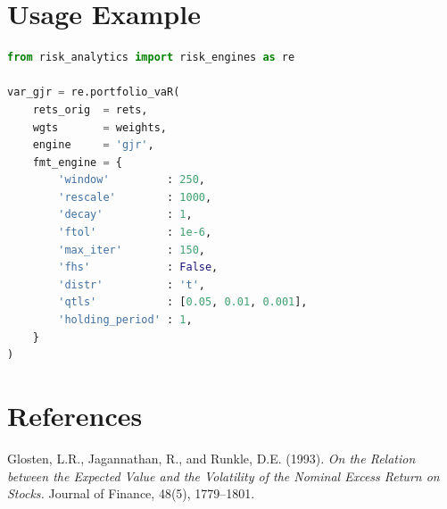 \documentclass[11pt, a4paper]{article}
\begin{document}
\section{Usage Example}

\begin{lstlisting}[language=Python]
from risk_analytics import risk_engines as re

var_gjr = re.portfolio_vaR(
    rets_orig  = rets,
    wgts       = weights,
    engine     = 'gjr',
    fmt_engine = {
        'window'         : 250,
        'rescale'        : 1000,
        'decay'          : 1,
        'ftol'           : 1e-6,
        'max_iter'       : 150,
        'fhs'            : False,
        'distr'          : 't',
        'qtls'           : [0.05, 0.01, 0.001],
        'holding_period' : 1,
    }
)
\end{lstlisting}

\section{References}

Glosten, L.R., Jagannathan, R., and Runkle, D.E. (1993).
\textit{On the Relation between the Expected Value and the Volatility of
the Nominal Excess Return on Stocks.}
Journal of Finance, 48(5), 1779--1801.
\end{document}
